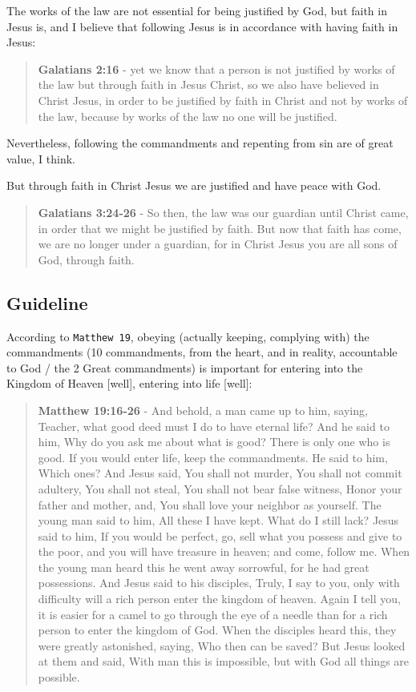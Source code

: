 \documentclass[11pt]{article}
\begin{document}
The works of the law are not essential for being justified by God, but faith in Jesus is, and I believe that following Jesus is in accordance with having faith in Jesus:

\begin{quote}
\textbf{Galatians 2:16} - yet we know that a person is not justified by works of the law but through faith in Jesus Christ, so we also have believed in Christ Jesus, in order to be justified by faith in Christ and not by works of the law, because by works of the law no one will be justified.
\end{quote}

Nevertheless, following the commandments and repenting from sin are of great value, I think.

But through faith in Christ Jesus we are justified and have peace with God.

\begin{quote}
\textbf{Galatians 3:24-26} - So then, the law was our guardian until Christ came, in order that we might be justified by faith. But now that faith has come, we are no longer under a guardian, for in Christ Jesus you are all sons of God, through faith.
\end{quote}

\subsection{Guideline}
\label{sec:orgf5dfdb2}
According to \texttt{Matthew 19}, obeying (actually keeping, complying with) the commandments (10 commandments, from the heart, and in reality, accountable to God / the 2 Great commandments) is important for entering into the Kingdom of Heaven [well], entering into life [well]:

\begin{quote}
\textbf{Matthew 19:16-26} - And behold, a man came up to him, saying, Teacher, what good deed must I do to have eternal life? And he said to him, Why do you ask me about what is good? There is only one who is good. If you would enter life, keep the commandments. He said to him, Which ones? And Jesus said, You shall not murder, You shall not commit adultery, You shall not steal, You shall not bear false witness, Honor your father and mother, and, You shall love your neighbor as yourself. The young man said to him, All these I have kept. What do I still lack? Jesus said to him, If you would be perfect, go, sell what you possess and give to the poor, and you will have treasure in heaven; and come, follow me. When the young man heard this he went away sorrowful, for he had great possessions. And Jesus said to his disciples, Truly, I say to you, only with difficulty will a rich person enter the kingdom of heaven. Again I tell you, it is easier for a camel to go through the eye of a needle than for a rich person to enter the kingdom of God. When the disciples heard this, they were greatly astonished, saying, Who then can be saved? But Jesus looked at them and said, With man this is impossible, but with God all things are possible.
\end{quote}
\end{document}
